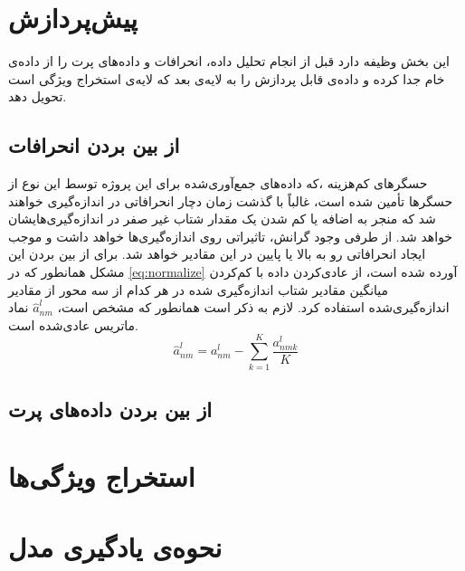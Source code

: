 \section{پیش‌پردازش}
این بخش وظیفه دارد قبل از انجام تحلیل داده، انحرافات و داده‌های پرت را از داده‌ی خام جدا کرده و داده‌ی قابل پردازش را به لایه‌ی بعد که لایه‌ی استخراج ویژگی‌ است تحویل دهد.

\subsection{از بین بردن انحرافات}
 حسگرهای کم‌هزینه  ،که داده‌های جمع‌آوری‌شده برای این پروژه توسط این نوع از حسگرها تأمین شده است، غالباً با گذشت زمان دچار انحرافاتی در اندازه‌گیری خواهند شد که منجر به اضافه یا کم شدن یک مقدار شتاب غیر صفر در اندازه‌گیری‌هایشان خواهد شد. از طرفی وجود گرانش، تاثیراتی روی اندازه‌گیری‌ها خواهد داشت و موجب ایجاد انحرافاتی رو به بالا یا پایین در این مقادیر خواهد شد\cite{jung2017vibration}. برای از بین بردن این مشکل همانطور که در \cref{eq:normalize} آورده شده است، از عادی‌کردن داده با کم‌کردن میانگین مقادیر شتاب اندازه‌گیری شده در هر کدام از سه محور از مقادیر اندازه‌گیری‌شده استفاده کرد. لازم به ذکر است همانطور که مشخص است، $\hat{a}^l_{nm}$ نماد ماتریس عادی‌شده است.
\begin{equation}
\label{eq:normalize}
	\hat{a}^l_{nm}=a^l_{nm}-\sum_{k=1}^K \dfrac{a^l_{nmk}}{K}
\end{equation}


\subsection{از بین بردن داده‌های پرت}


\section{استخراج ویژگی‌ها}


\section{نحوه‌ی یادگیری مدل}